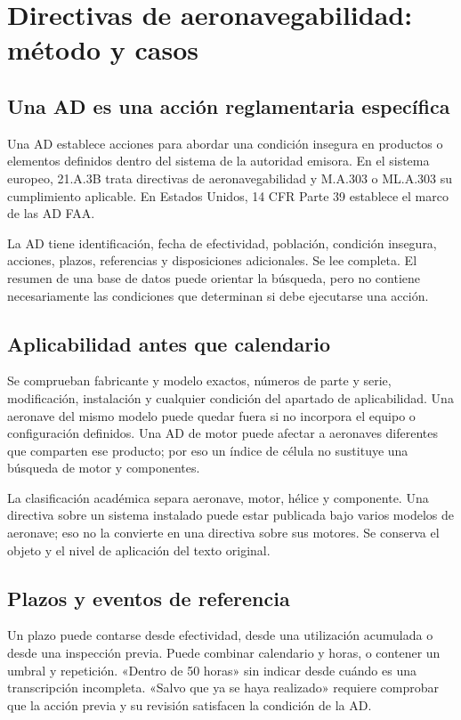 \chapter{Directivas de aeronavegabilidad: método y casos}\label{ch:21}
\section{Una AD es una acción reglamentaria específica}
Una AD establece acciones para abordar una condición insegura en productos o elementos definidos dentro del sistema de la autoridad emisora. En el sistema europeo, 21.A.3B trata directivas de aeronavegabilidad y M.A.303 o ML.A.303 su cumplimiento aplicable. En Estados Unidos, 14 CFR Parte 39 establece el marco de las AD FAA.

La AD tiene identificación, fecha de efectividad, población, condición insegura, acciones, plazos, referencias y disposiciones adicionales. Se lee completa. El resumen de una base de datos puede orientar la búsqueda, pero no contiene necesariamente las condiciones que determinan si debe ejecutarse una acción.
\section{Aplicabilidad antes que calendario}
Se comprueban fabricante y modelo exactos, números de parte y serie, modificación, instalación y cualquier condición del apartado de aplicabilidad. Una aeronave del mismo modelo puede quedar fuera si no incorpora el equipo o configuración definidos. Una AD de motor puede afectar a aeronaves diferentes que comparten ese producto; por eso un índice de célula no sustituye una búsqueda de motor y componentes.

La clasificación académica separa aeronave, motor, hélice y componente. Una directiva sobre un sistema instalado puede estar publicada bajo varios modelos de aeronave; eso no la convierte en una directiva sobre sus motores. Se conserva el objeto y el nivel de aplicación del texto original.
\section{Plazos y eventos de referencia}
Un plazo puede contarse desde efectividad, desde una utilización acumulada o desde una inspección previa. Puede combinar calendario y horas, o contener un umbral y repetición. «Dentro de 50 horas» sin indicar desde cuándo es una transcripción incompleta. «Salvo que ya se haya realizado» requiere comprobar que la acción previa y su revisión satisfacen la condición de la AD.

